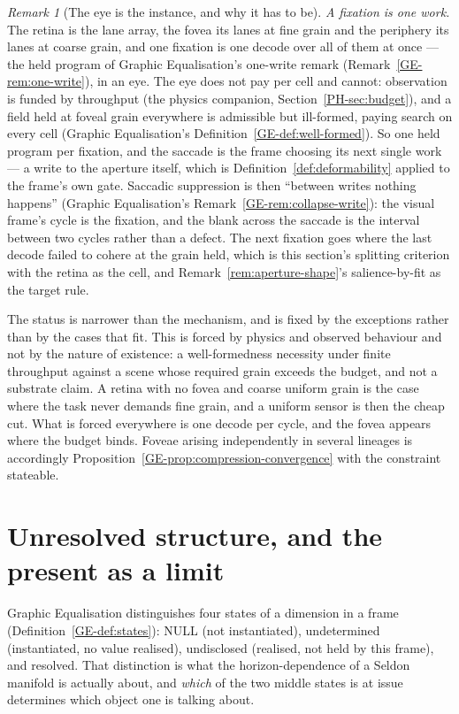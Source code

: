 \documentclass[11pt,a4paper]{article}
\theoremstyle{remark}
\newtheorem{remark}[definition]{Remark}
\begin{document}
\begin{remark}[The eye is the instance, and why it has to be]\label{rem:eye}
\emph{A fixation is one work.} The retina is the lane array, the fovea its lanes at fine grain and the
periphery its lanes at coarse grain, and one fixation is one decode over all of them at once --- the
held program of Graphic Equalisation's one-write remark (Remark~\ref{GE-rem:one-write}), in an eye. The
eye does not pay per cell and cannot: observation is funded by throughput (the physics companion,
Section~\ref{PH-sec:budget}), and a field held at foveal grain everywhere is admissible but ill-formed,
paying search on every cell (Graphic Equalisation's Definition~\ref{GE-def:well-formed}). So one held
program per fixation, and the saccade is the frame choosing its next single work --- a write to the
aperture itself, which is Definition~\ref{def:deformability} applied to the frame's own gate. Saccadic
suppression is then ``between writes nothing happens'' (Graphic
Equalisation's Remark~\ref{GE-rem:collapse-write}): the visual frame's cycle is the fixation, and the
blank across the saccade is the interval between two cycles rather than a defect. The next fixation
goes where the last decode failed to cohere at the grain held, which is this section's splitting
criterion with the retina as the cell, and Remark~\ref{rem:aperture-shape}'s salience-by-fit as the
target rule.

The status is narrower than the mechanism, and is fixed by the exceptions rather than by the cases that
fit. This is forced by physics and observed behaviour and not by the nature of existence: a
well-formedness necessity under finite throughput against a scene whose required grain exceeds the
budget, and not a substrate claim. A retina with no fovea and coarse uniform grain is the case where the
task never demands fine grain, and a uniform sensor is then the cheap cut. What is forced everywhere is
one decode per cycle, and the fovea appears where the budget binds. Foveae arising independently in
several lineages is accordingly Proposition~\ref{GE-prop:compression-convergence} with the constraint
stateable.
\end{remark}

\section{Unresolved structure, and the present as a limit}\label{sec:unresolved}

Graphic Equalisation distinguishes four states of a dimension in a frame (Definition~\ref{GE-def:states}): NULL (not instantiated), undetermined (instantiated, no value realised), undisclosed (realised, not held by this frame), and resolved. That distinction is what the horizon-dependence of a Seldon manifold is actually about, and \emph{which} of the two middle states is at issue determines which object one is talking about.
\end{document}
